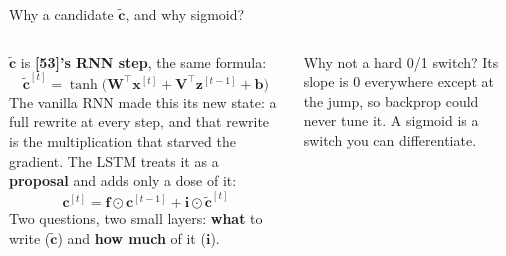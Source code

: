 \documentclass[aspectratio=169]{beamer}
\begin{document}
\begin{frame}{Why a candidate $\tilde{\mathbf{c}}$, and why sigmoid?}
  \begin{columns}[T]
    \small
    $\tilde{\mathbf{c}}$ is \textbf{[53]'s RNN step}, the same formula:
    \[
      \tilde{\mathbf{c}}^{[t]} = \tanh\big(\mathbf{W}^\top\mathbf{x}^{[t]}
        + \mathbf{V}^\top\mathbf{z}^{[t-1]} + \mathbf{b}\big)
    \]
    The vanilla RNN made this its new state: a full rewrite at every step, and that rewrite
    is the multiplication that starved the gradient. The LSTM treats it as a
    \textbf{proposal} and adds only a dose of it:
    \[
      \mathbf{c}^{[t]} = \mathbf{f}\odot\mathbf{c}^{[t-1]} + \mathbf{i}\odot\tilde{\mathbf{c}}^{[t]}
    \]
    Two questions, two small layers: \textbf{what} to write ($\tilde{\mathbf{c}}$) and
    \textbf{how much} of it ($\mathbf{i}$).
    \vskip 6pt
    \vskip 6pt
    {\footnotesize Why not a hard 0/1 switch? Its slope is $0$ everywhere except at the jump,
    so backprop could never tune it. A sigmoid is a switch you can differentiate.\par}
  \end{columns}
\end{frame}
\end{document}
